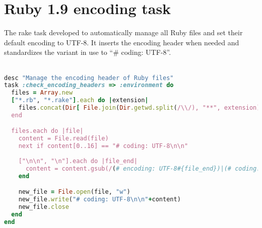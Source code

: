 \chapter{Ruby 1.9 encoding task} %
\label{ap:ruby19_encoding_patch}

The rake task developed to automatically manage all Ruby files and set their default encoding to UTF-8. It inserts the encoding header when needed and standardizes the variant in use to ``\# coding: UTF-8''.\\\\

\begin{lstlisting}[language=ruby]
desc "Manage the encoding header of Ruby files"
task :check_encoding_headers => :environment do
  files = Array.new
  ["*.rb", "*.rake"].each do |extension|
    files.concat(Dir[ File.join(Dir.getwd.split(/\\/), "**", extension) ])
  end

  files.each do |file|
    content = File.read(file)
    next if content[0..16] == "# coding: UTF-8\n\n"
    
    ["\n\n", "\n"].each do |file_end|
      content = content.gsub(/(# encoding: UTF-8#{file_end})|(# coding: UTF-8#{file_end})|(# -*- coding: UTF-8 -*-#{file_end})/i, "")
    end

    new_file = File.open(file, "w")
    new_file.write("# coding: UTF-8\n\n"+content)
    new_file.close
  end
end

\end{lstlisting}
